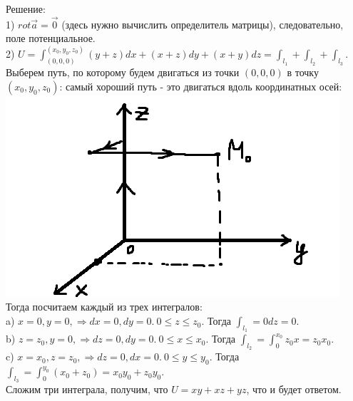\documentclass[12pt]{article}
\begin{document}
Решение:\\
1) $rot \overrightarrow{a} = \overrightarrow{0}$ (здесь нужно вычислить определитель матрицы), следовательно, поле потенциальное.\\
2) $U = \int_{(0,0,0)}^{(x_0,y_0,z_0)} (y+z) dx + (x+z) dy + (x + y) dz = \int_{l_1} + \int_{l_2} + \int_{l_3}$. Выберем путь, по которому будем двигаться из точки $(0,0,0)$ в точку $(x_0,y_0,z_0)$: самый хороший путь - это двигаться вдоль координатных осей:\\
\includegraphics{scalarPotential1}\\
Тогда посчитаем каждый из трех интегралов:\\
a) $x = 0, y = 0, \Rightarrow dx = 0, dy = 0. \ 0 \leq z \leq z_0$. Тогда $\int_{l_1} = 0dz = 0$.\\
b) $z = z_0, y = 0, \Rightarrow dz = 0, dy = 0. \ 0 \leq x \leq x_0$. Тогда $\int_{l_2} = \int_0^{x_0} z_0 x = z_0 x_0$.\\
c) $x = x_0, z = z_0, \Rightarrow dz = 0, dx = 0. \ 0 \leq y \leq y_0$. Тогда $\int_{l_3} = \int_0^{y_0} (x_0 + z_0) = x_0 y_0 + z_0 y_0$.\\
Сложим три интеграла, получим, что $U = xy + xz + yz$, что и будет ответом.\\
\end{document}
